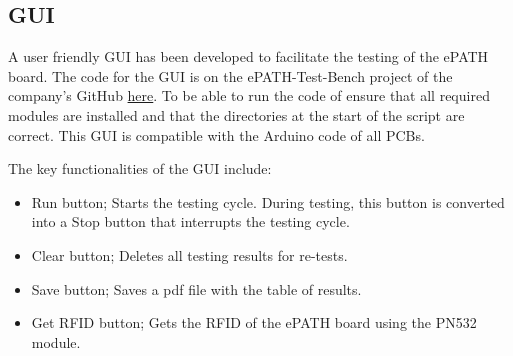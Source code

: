 \subsection{GUI}
A user friendly GUI has been developed to facilitate the testing of the ePATH board. The code for the GUI is on the ePATH-Test-Bench project of the company's GitHub \href{https://github.com/pathfinder-medical/ePATH-Test-Bench}{here}. To be able to run the code of ensure that all required modules are installed and that the directories at the start of the script are correct. This GUI is compatible with the Arduino code of all PCBs.

The key functionalities of the GUI include:
\begin{itemize}
\item Run button; Starts the testing cycle. During testing, this button is converted into a Stop button that interrupts the testing cycle.
\item Clear button; Deletes all testing results for re-tests.
\item Save button; Saves a pdf file with the table of results.
\item Get RFID button; Gets the RFID of the ePATH board using the PN532 module.
\end{itemize}



